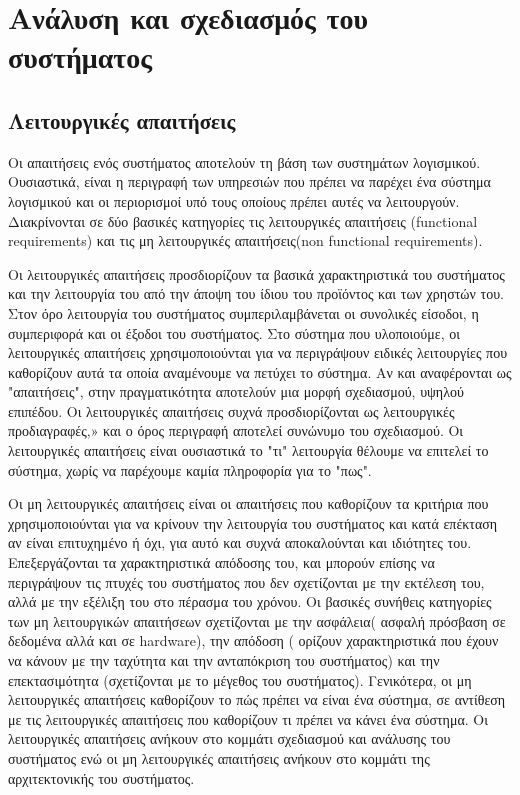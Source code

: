 \graphicspath{ {Figures/system_analysis/} }

\chapter{Ανάλυση και σχεδιασμός του συστήματος}\label{ch:Analysis of LifeDonor}
\section{Λειτουργικές απαιτήσεις}\label{sec:Functional Requirements}

	Οι απαιτήσεις ενός συστήματος αποτελούν τη βάση των συστημάτων λογισμικού. Ουσιαστικά, είναι η περιγραφή των υπηρεσιών που πρέπει να παρέχει ένα σύστημα λογισμικού και οι περιορισμοί υπό τους οποίους πρέπει αυτές να λειτουργούν. Διακρίνονται σε δύο βασικές κατηγορίες τις λειτουργικές απαιτήσεις (functional requirements) και τις μη λειτουργικές απαιτήσεις(non functional requirements). 
	
	Οι λειτουργικές απαιτήσεις προσδιορίζουν τα βασικά χαρακτηριστικά του συστήματος και την λειτουργία του από την άποψη του ίδιου του προϊόντος και των χρηστών του. Στον όρο λειτουργία του συστήματος συμπεριλαμβάνεται οι συνολικές είσοδοι, η συμπεριφορά και οι έξοδοι του συστήματος. Στο σύστημα που υλοποιούμε, οι λειτουργικές απαιτήσεις χρησιμοποιούνται για να περιγράψουν ειδικές λειτουργίες που καθορίζουν αυτά τα οποία αναμένουμε να πετύχει το σύστημα. Αν και αναφέρονται ως "απαιτήσεις", στην πραγματικότητα αποτελούν μια μορφή σχεδιασμού, υψηλού επιπέδου. Οι λειτουργικές απαιτήσεις συχνά προσδιορίζονται ως λειτουργικές προδιαγραφές,» και ο όρος περιγραφή αποτελεί συνώνυμο του σχεδιασμού. Οι λειτουργικές απαιτήσεις είναι ουσιαστικά το "τι" λειτουργία θέλουμε να επιτελεί το σύστημα, χωρίς να παρέχουμε καμία πληροφορία για το "πως".
	
	Οι μη λειτουργικές απαιτήσεις είναι οι απαιτήσεις που καθορίζουν τα κριτήρια που χρησιμοποιούνται για να κρίνουν την λειτουργία του συστήματος και κατά επέκταση  αν είναι επιτυχημένο ή όχι, για αυτό και συχνά αποκαλούνται και ιδιότητες του. Επεξεργάζονται τα χαρακτηριστικά απόδοσης του, και μπορούν επίσης να περιγράψουν τις πτυχές του συστήματος που δεν σχετίζονται με την εκτέλεση του, αλλά με την εξέλιξη του στο πέρασμα του χρόνου. Οι βασικές συνήθεις κατηγορίες των μη λειτουργικών απαιτήσεων σχετίζονται με την ασφάλεια( ασφαλή πρόσβαση σε δεδομένα αλλά και σε hardware), την απόδοση ( ορίζουν χαρακτηριστικά που έχουν να κάνουν με την ταχύτητα και την ανταπόκριση του συστήματος) και την επεκτασιμότητα (σχετίζονται με το μέγεθος του συστήματος). Γενικότερα, οι μη λειτουργικές απαιτήσεις καθορίζουν το πώς πρέπει να είναι ένα σύστημα, σε αντίθεση με τις λειτουργικές απαιτήσεις που καθορίζουν τι πρέπει να κάνει ένα σύστημα. Οι λειτουργικές απαιτήσεις ανήκουν στο κομμάτι σχεδιασμού και ανάλυσης του συστήματος ενώ οι μη λειτουργικές απαιτήσεις ανήκουν στο κομμάτι της αρχιτεκτονικής του συστήματος.
	
